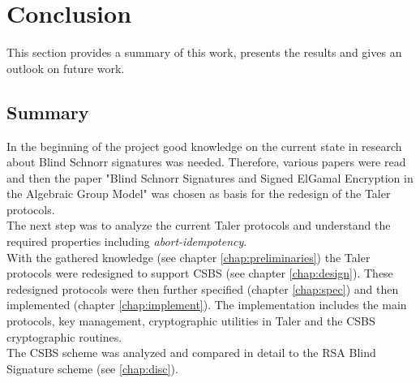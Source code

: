 \chapter{Conclusion}
This section provides a summary of this work, presents the results and gives an outlook on future work.

\section{Summary}
In the beginning of the project good knowledge on the current state in research about Blind Schnorr signatures was needed.
Therefore, various papers were read and then the paper "Blind Schnorr Signatures and Signed ElGamal Encryption in the Algebraic Group Model" \cite{cryptoeprint:2019:877} was chosen as basis for the redesign of the Taler protocols.\\
The next step was to analyze the current Taler protocols and understand the required properties including \textit{\gls{abort-idempotency}}.\\
With the gathered knowledge (see chapter \ref{chap:preliminaries}) the Taler protocols were redesigned to support \gls{CSBS} (see chapter \ref{chap:design}).
These redesigned protocols were then further specified (chapter \ref{chap:spec}) and then implemented (chapter \ref{chap:implement}).
The implementation includes the main protocols, key management, cryptographic utilities in Taler and the \gls{CSBS} cryptographic routines.\\
The \gls{CSBS} scheme was analyzed and compared in detail to the RSA Blind Signature scheme (see \ref{chap:disc}).


